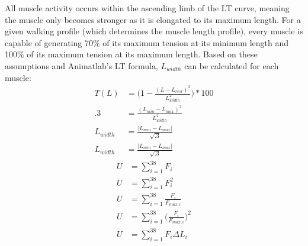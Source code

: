 \documentclass[runningheads,a4paper]{llncs}
\begin{document}
			All muscle activity occurs within the ascending limb of the LT curve, meaning the muscle only becomes stronger as it is elongated to its maximum length. For a given walking profile (which determines the muscle length profile), every muscle is capable of generating 70\% of its maximum tension at its minimum length and 100\% of its maximum tension at its maximum length. Based on these assumptions and Animatlab's LT formula, $L_{width}$ can be calculated for each muscle:
				\begin{align*}
					T(L) &= \big(1-\frac{(L-L_{rest})^2}{L_{width}^2}\big)*100 \\
					.3 &= \frac{(L_{min}-L_{max})^2}{L_{width}^2} \\
					L_{width} &= \frac{|L_{min}-L_{max}|}{\sqrt{.3}} \\
		 			L_{width} &= \frac{|L_{min}-L_{max}|}{\sqrt{.3}}
				\end{align*}
				\begin{align*}
					U &= \sum_{i=1}^{38} F_{i} \\
					U &= \sum_{i=1}^{38} F_{i}^{2} \\
					U &= \sum_{i=1}^{38} \frac{F_{i}}{F_{max,i}} \\
					U &= \sum_{i=1}^{38} \big(\frac{F_{i}}{F_{max,i}}\big)^{2}  \\
					U &= \sum_{i=1}^{38} F_{i} \Delta L_{i} \\
				\end{align*}
		\FloatBarrier
\end{document}
